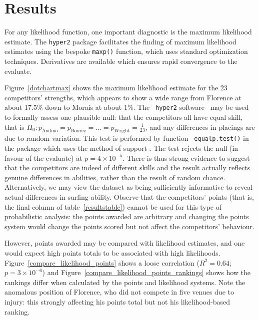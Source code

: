 \documentclass{article}
\begin{document}
\section{Results}

For any likelihood function, one important diagnostic is the maximum
likelihood estimate.  The {\tt hyper2} package facilitates the finding
of maximum likelihood estimates using the bespoke {\tt maxp()}
function, which uses standard optimization techniques.  Derivatives
are available which ensures rapid convergence to the evaluate.

Figure~\ref{dotchartmax} shows the maximum likelihood estimate for the
23 competitors' strengths, which appears to show a wide range from
Florence at about 17.5\% down to Morais at about 1\%.  The {\tt
  hyper2} software~\citep{hankin2017_nomarkup} may be used to formally assess
one plausible null: that the competitors all have equal skill, that is
$H_0\colon p_\mathrm{Andino} = p_\mathrm{Bourez}=\ldots=
p_\mathrm{Wright}=\frac{1}{23}$, and any differences in placings are
due to random variation.  This test is performed by function {\tt
  equalp.test()} in the package which uses the method of support
\citep{edwards1992}.  The test rejects the null (in favour of the
evaluate) at $p=4\times 10^{-5}$.  There is thus strong evidence to
suggest that the competitors are indeed of different skills and the
result actually reflects genuine differences in abilities, rather than
the result of random chance.  Alternatively, we may view the dataset
as being sufficiently informative to reveal actual differences in
surfing ability.  Observe that the competitors' points (that is, the
final column of table~\ref{resultstable}) cannot be used for this type
of probabilistic analysis: the points awarded are arbitrary and
changing the points system would change the points scored but not
affect the competitors' behaviour.

However, points awarded may be compared with likelihood estimates, and
one would expect high points totals to be associated with high
likelihoods.  Figure~\ref{compare_likelihood_points} shows a loose
correlation ($R^2=0.64$; $p=3\times 10^{-6}$) and
Figure~\ref{compare_likelihood_points_rankings} shows how the rankings
differ when calculated by the points and likelihood systems.  Note the
anomalous position of Florence, who did not compete in five venues due
to injury: this strongly affecting his points total but not his
likelihood-based ranking.
\end{document}
